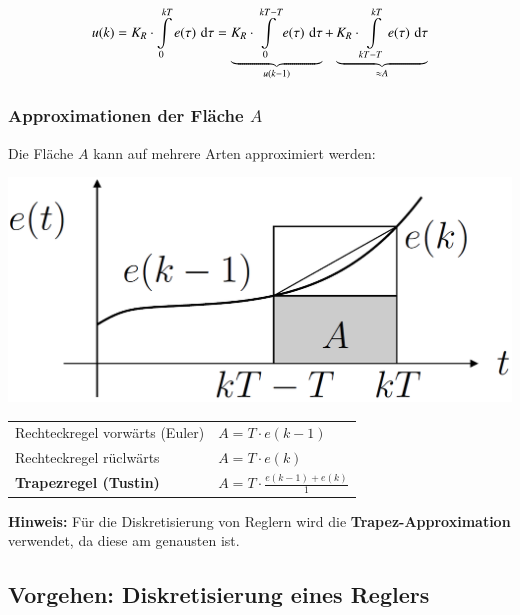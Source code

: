 $$ u(k) = K_R \cdot \int\limits_0^{kT} e(\tau) \, \mathop{} \! \mathrm{d} \tau
    = \underbrace{K_R \cdot \int\limits_0^{kT- T} e(\tau) \, \mathop{} \! \mathrm{d} \tau}_{u(k-1)} 
    + \underbrace{K_R \cdot \int\limits_{kT-T}^{kT} e(\tau) \, \mathop{} \! \mathrm{d} \tau}_{\approx A} $$


\subsubsection{Approximationen der Fläche $A$}

Die Fläche $A$ kann auf mehrere Arten approximiert werden:


\begin{minipage}[c]{0.3\columnwidth}
    \includegraphics[width=\columnwidth]{images/approximation_integration.png}
\end{minipage}
\hfill
\begin{minipage}[c]{0.68\columnwidth}
    \begin{tabular}{ll}
        Rechteckregel vorwärts (Euler)      & $ A = T \cdot e(k-1) $    \\
        Rechteckregel rüclwärts             & $ A = T \cdot e(k)$       \\
        \textbf{Trapezregel (Tustin)}       & $ A = T \cdot \frac{e(k-1) + e(k)}{1} $ 
    \end{tabular}
\end{minipage}

\vspace{0.2cm}
\textbf{Hinweis:} Für die Diskretisierung von Reglern wird die \textbf{Trapez-Approximation} verwendet, da diese am genausten ist.


\subsection{Vorgehen: Diskretisierung eines Reglers}

